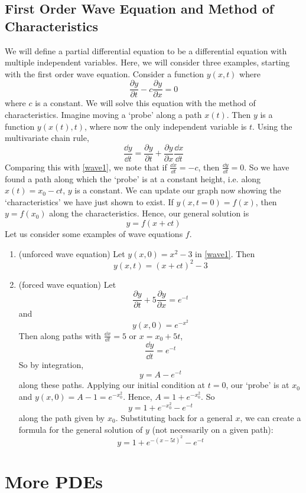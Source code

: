 \documentclass{article}
\begin{document}
	\subsection{First Order Wave Equation and Method of Characteristics}
	We will define a partial differential equation to be a differential equation with multiple independent variables. Here, we will consider three examples, starting with the first order wave equation. Consider a function $y(x, t)$ where
	\begin{equation}\label{wave1}
		\frac{\partial y}{\partial t} - c\frac{\partial y}{\partial x} = 0
	\end{equation}
	where $c$ is a constant. We will solve this equation with the method of characteristics.
	Imagine moving a `probe' along a path $x(t)$. Then $y$ is a function $y(x(t), t)$, where now the only independent variable is $t$. Using the multivariate chain rule,
	\[ \frac{\dd y}{\dd t} = \frac{\partial y}{\partial t} + \frac{\partial y}{\partial x}\frac{\dd x}{\dd t} \]
	Comparing this with \eqref{wave1}, we note that if $\frac{\dd x}{\dd t} = -c$, then $\frac{\dd y}{\dd t} = 0$. So we have found a path along which the `probe' is at a constant height, i.e. along $x(t) = x_0 - ct$, $y$ is a constant. We can update our graph now showing the `characteristics' we have just shown to exist.
	If $y(x, t = 0) = f(x)$, then $y = f(x_0)$ along the characteristics. Hence, our general solution is
	\[ y = f(x+ct) \]
	Let us consider some examples of wave equations $f$.
	\begin{enumerate}
		\item (unforced wave equation) Let $y(x,0) = x^2 - 3$ in \eqref{wave1}. Then
		\[ y(x, t) = (x+ct)^2 - 3 \]
		\item (forced wave equation) Let
		\[ \frac{\partial y}{\partial t} + 5\frac{\partial y}{\partial x} = e^{-t} \]
		and
		\[ y(x, 0) = e^{-x^2} \]
		Then along paths with $\frac{\dd x}{\dd t} = 5$ or $x=x_0 + 5t$,
		\[ \frac{\dd y}{\dd t} = e^{-t} \]
		So by integration,
		\[ y = A-e^{-t} \]
		along these paths. Applying our initial condition at $t=0$, our `probe' is at $x_0$ and $y(x, 0) = A - 1 = e^{-x_0^2}$. Hence, $A = 1 + e^{-x_0^2}$. So
		\[ y = 1 + e^{-x_0^2} - e^{-t} \]
		along the path given by $x_0$. Substituting back for a general $x$, we can create a formula for the general solution of $y$ (not necessarily on a given path):
		\[ y = 1 + e^{-(x-5t)^2} - e^{-t} \]
	\end{enumerate}

	\section{More PDEs}
\end{document}
